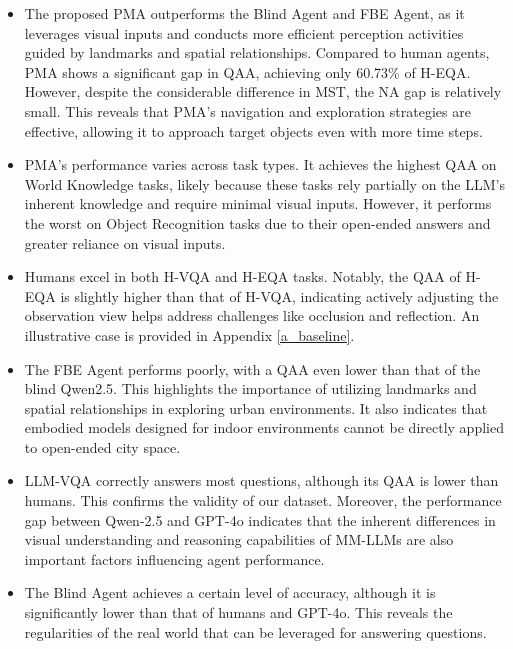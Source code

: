 \begin{itemize}[leftmargin=*]
    \item The proposed PMA outperforms the Blind Agent and FBE Agent, as it leverages visual inputs and conducts more efficient perception activities guided by landmarks and spatial relationships. 
    Compared to human agents, PMA shows a significant gap in QAA, achieving only 60.73\% of H-EQA. However, despite the considerable difference in MST, the NA gap is relatively small. This reveals that PMA's navigation and exploration strategies are effective, allowing it to approach target objects even with more time steps.

    \vspace{-6pt}
    \item PMA's performance varies across task types. It achieves the highest QAA on World Knowledge tasks, likely because these tasks rely partially on the LLM's inherent knowledge and require minimal visual inputs. However, it performs the worst on Object Recognition tasks due to their open-ended answers and greater reliance on visual inputs. 
    \vspace{-6pt}
    \item Humans excel in both H-VQA and H-EQA tasks. Notably, the QAA of H-EQA is slightly higher than that of H-VQA, indicating actively adjusting the observation view helps address challenges like occlusion and reflection. An illustrative case is provided in Appendix \ref{a_baseline}.
    \vspace{-6pt}
    \item The FBE Agent performs poorly, with a QAA even lower than that of the blind Qwen2.5. This highlights the importance of utilizing landmarks and spatial relationships in exploring urban environments. It also indicates that embodied models designed for indoor environments cannot be directly applied to open-ended city space.
    \vspace{-6pt}
    \item LLM-VQA correctly answers most questions, although its QAA is lower than humans. This confirms the validity of our dataset. Moreover, the performance gap between Qwen-2.5 and GPT-4o indicates that the inherent differences in visual understanding and reasoning capabilities of MM-LLMs are also important factors influencing agent performance.
    \vspace{-6pt}
    \item The Blind Agent achieves a certain level of accuracy, although it is significantly lower than that of humans and GPT-4o. This reveals the regularities of the real world that can be leveraged for answering questions.
    
\end{itemize}
\vspace{-6pt}

